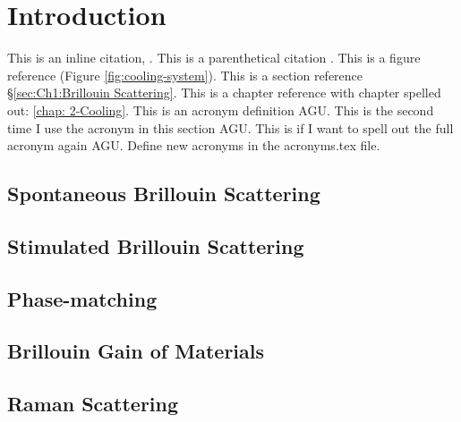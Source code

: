 \chapter{Introduction}
\label{ch:Introduction}
\acresetall

This is an inline citation, \cite{boyd2020nonlinear}. This is a parenthetical citation \citep{boyd2020nonlinear}. This is a figure reference (Figure \ref{fig:cooling-system}). This is a section reference \S\ref{sec:Ch1:Brillouin Scattering}. This is a chapter reference with chapter spelled out: \autoref{chap: 2-Cooling}. This is an acronym definition \ac{AGU}. This is the second time I use the acronym in this section \ac{AGU}. This is if I want to spell out the full acronym again \acf{AGU}. Define new acronyms in the acronyms.tex file.


\section{Spontaneous Brillouin Scattering}
\label{sec:Introduction:Spontaneous}
\lipsum[1]

\section{Stimulated Brillouin Scattering}
\label{sec:Introduction:Stimulated}
\lipsum[1]

\section{Phase-matching}
\label{sec:Introduction:Phase-matching}
\lipsum[1]

\section{Brillouin Gain of Materials}
\label{subsec:Introduction:Gain}

\section{Raman Scattering}
\label{sec:Introduction:Raman}
\lipsum[1]
